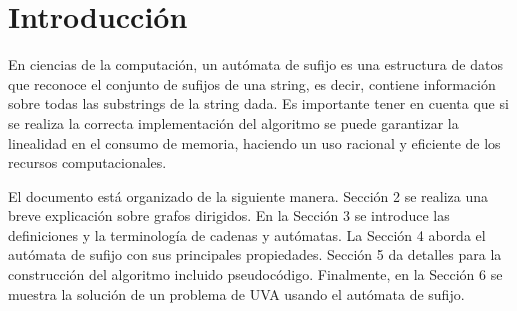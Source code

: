\section{Introducción}\label{Introduction}
En ciencias de la computación, un autómata de sufijo es una estructura de datos que reconoce el conjunto de sufijos de una \gls{string}, es decir, contiene información sobre todas las \glspl{substring} de la \gls{string} dada. Es importante tener en cuenta que si se realiza la correcta implementación del algoritmo se puede garantizar la linealidad en el consumo de memoria, haciendo un uso racional y eficiente de los recursos computacionales.

El documento está organizado de la siguiente manera. Sección 2 se realiza una breve explicación sobre grafos dirigidos. En la Sección 3 se introduce las definiciones y la terminología de cadenas y autómatas. La Sección 4 aborda el autómata de sufijo con sus principales propiedades. Sección 5 da detalles para la construcción del algoritmo incluido pseudocódigo. Finalmente, en la Sección 6 se muestra la solución de un problema de UVA usando el autómata de sufijo.